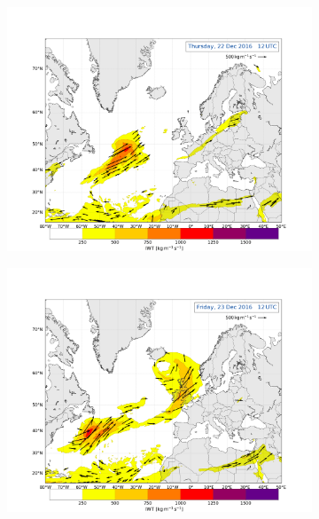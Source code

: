 \begin{figure}\ContinuedFloat
	\centering
	\begin{subfigure}[b]{0.49\textwidth}
		\includegraphics[trim={4.2cm 3.9cm 4.3cm 5.1cm},clip,
		width=\textwidth]{./fig_Atm_Riv/20161222_12}
		\caption{}\label{fig:AR22}
	\end{subfigure}
	\begin{subfigure}[b]{0.49\textwidth}
		\includegraphics[trim={4.2cm 3.9cm 4.3cm 5.1cm},clip,
		width=\textwidth]{./fig_Atm_Riv/20161223_12}
		\caption{}\label{fig:AR23}
	\end{subfigure}

\end{figure}
